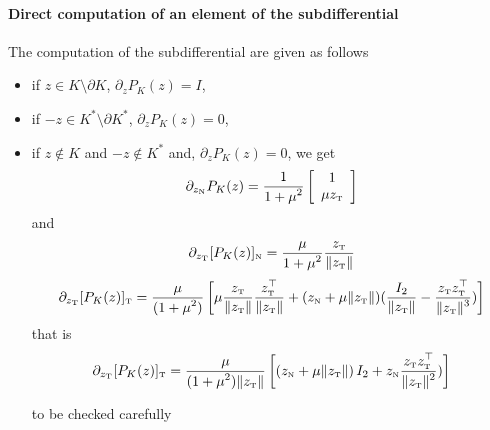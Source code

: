 \paragraph{Direct computation of an element of the subdifferential}

The computation of the subdifferential are given as follows
\begin{itemize}
\item if $z\in K\setminus \partial K$, $\partial_z P_K(z) =I$,
\item if $-z \in K^*\setminus \partial K^*$, $\partial_z P_K(z) =0$,
\item if $z \notin K$ and $-z \notin K^*$ and, $\partial_z P_K(z) =0$, we get
\begin{equation}
  \label{eq:sub-proj_n}
  \partial_{z_\n} P_{K}(z) =
  \Frac 1 {1+\mu^2}
  \left[
    \begin{array}{c}
      1 \\
      \mu z_\t
    \end{array}\right] 
\end{equation}
and
\begin{equation}
  \label{eq:sub-proj_t1}
  \partial_{z_\t} [P_{K}(z)]_\n =
  \Frac \mu {1+\mu^2} \Frac {z_\t} {\|z_\t\|}
\end{equation}
\begin{equation}
  \label{eq:sub-proj_2}
  \partial_{z_\t} [P_{K}(z)]_\t =
  \Frac {\mu} {(1+\mu^2)} \left[\mu \Frac {z_\t} {\|z_\t\|} \Frac {z^\top_\t} {\|z_\t\|}+ (z_\n + \mu \|z_\t\|) (\Frac{I_2}{\|z_\t\|} - \Frac{z_\t z_\t^\top}{\|z_\t\|^3} )\right]
\end{equation}
that is
\begin{equation}
  \label{eq:sub-proj_2_bis}
  \partial_{z_\t} [P_{K}(z)]_\t =
  \Frac {\mu} {(1+\mu^2)\|z_\t\|} \left[ (z_\n + \mu \|z_\t\|) \,I_2   +  z_\n  \Frac{z_\t z_\t^\top}{\|z_\t\|^2} )\right]
\end{equation}
\begin{ndrva}
  to be checked carefully
\end{ndrva}

\end{itemize}


